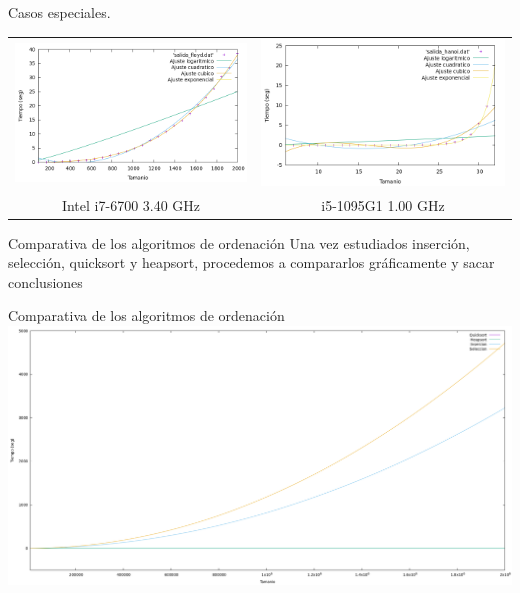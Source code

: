 \documentclass[10pt, xcolor=table]{beamer}
\begin{document}
\begin{frame}[fragile]{Casos especiales.
}
\centering
\begin{tabular}{cc}
\includegraphics[scale=0.2]{../../Images/floy_comparacion.png}
&
\includegraphics[scale=0.2]{../../Images/hanoi_comparacion.png}
\\
Intel i7-6700 3.40 GHz & i5-1095G1 1.00 GHz
\end{tabular}
\end{frame}


\begin{frame}{Comparativa de los algoritmos de ordenación}
Una vez estudiados inserción, selección, quicksort y heapsort, procedemos a compararlos gráficamente y sacar conclusiones
\end{frame}

\begin{frame}[fragile]{Comparativa de los algoritmos de ordenación}
\centering
\includegraphics[scale=0.15]{../../Images/Gráfica comparativa algoritmos de ordenación Joshoccas.png}
\end{frame}
\end{document}
